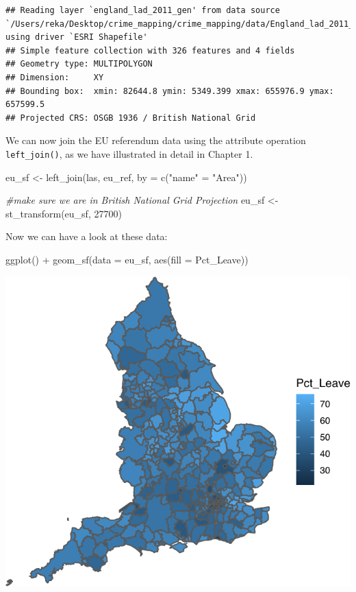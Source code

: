 \documentclass[
]{book}
\newenvironment{Shaded}{\begin{snugshade}}{\end{snugshade}}
\newcommand{\AttributeTok}[1]{\textcolor[rgb]{0.77,0.63,0.00}{#1}}
\newcommand{\CommentTok}[1]{\textcolor[rgb]{0.56,0.35,0.01}{\textit{#1}}}
\newcommand{\DecValTok}[1]{\textcolor[rgb]{0.00,0.00,0.81}{#1}}
\newcommand{\FunctionTok}[1]{\textcolor[rgb]{0.00,0.00,0.00}{#1}}
\newcommand{\NormalTok}[1]{#1}
\newcommand{\OtherTok}[1]{\textcolor[rgb]{0.56,0.35,0.01}{#1}}
\newcommand{\SpecialCharTok}[1]{\textcolor[rgb]{0.00,0.00,0.00}{#1}}
\newcommand{\StringTok}[1]{\textcolor[rgb]{0.31,0.60,0.02}{#1}}
\begin{document}
\begin{verbatim}
## Reading layer `england_lad_2011_gen' from data source `/Users/reka/Desktop/crime_mapping/crime_mapping/data/England_lad_2011_gen/england_lad_2011_gen.shp' using driver `ESRI Shapefile'
## Simple feature collection with 326 features and 4 fields
## Geometry type: MULTIPOLYGON
## Dimension:     XY
## Bounding box:  xmin: 82644.8 ymin: 5349.399 xmax: 655976.9 ymax: 657599.5
## Projected CRS: OSGB 1936 / British National Grid
\end{verbatim}

We can now join the EU referendum data using the attribute operation \texttt{left\_join()}, as we have illustrated in detail in Chapter 1.

\begin{Shaded}
\begin{Highlighting}[]
\NormalTok{eu\_sf }\OtherTok{\textless{}{-}} \FunctionTok{left\_join}\NormalTok{(las, eu\_ref, }\AttributeTok{by =} \FunctionTok{c}\NormalTok{(}\StringTok{"name"} \OtherTok{=} \StringTok{"Area"}\NormalTok{))}

\CommentTok{\#make sure we are in British National Grid Projection}
\NormalTok{eu\_sf }\OtherTok{\textless{}{-}} \FunctionTok{st\_transform}\NormalTok{(eu\_sf, }\DecValTok{27700}\NormalTok{)}
\end{Highlighting}
\end{Shaded}

Now we can have a look at these data:

\begin{Shaded}
\begin{Highlighting}[]
\FunctionTok{ggplot}\NormalTok{() }\SpecialCharTok{+}
  \FunctionTok{geom\_sf}\NormalTok{(}\AttributeTok{data =}\NormalTok{ eu\_sf, }\FunctionTok{aes}\NormalTok{(}\AttributeTok{fill =}\NormalTok{ Pct\_Leave)) }
\end{Highlighting}
\end{Shaded}

\includegraphics{crime_mapping_files/figure-latex/unnamed-chunk-134-1.pdf}
\end{document}
